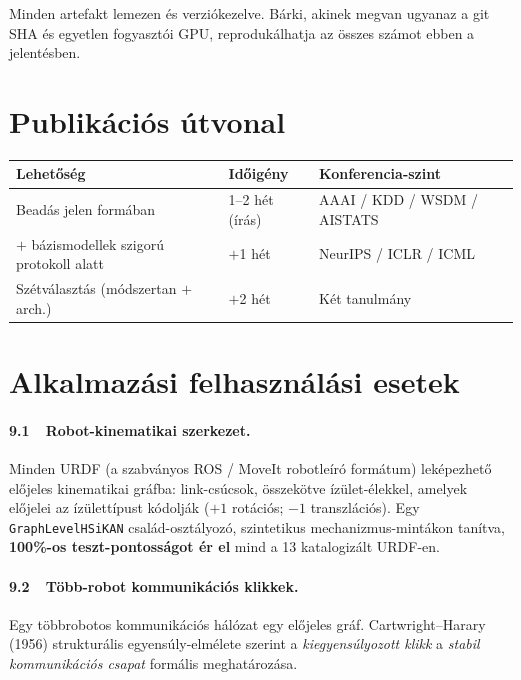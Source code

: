 \documentclass[11pt,a4paper]{article}
\begin{document}
Minden artefakt lemezen \'es verzi\'okezelve. B\'arki, akinek megvan
ugyanaz a git SHA \'es egyetlen fogyaszt\'oi GPU, reproduk\'alhatja az
\"osszes sz\'amot ebben a jelent\'esben.

\section{Publik\'aci\'os \'utvonal}

\begin{center}
\begin{tabular}{lll}
\toprule
\textbf{Lehet\H{o}s\'eg} & \textbf{Id\H{o}ig\'eny} & \textbf{Konferencia-szint} \\
\midrule
Bead\'as jelen form\'aban                  & 1--2 h\'et (\'ir\'as) & AAAI / KDD / WSDM / AISTATS \\
$+$ b\'azismodellek szigor\'u protokoll alatt & $+$1 h\'et           & NeurIPS / ICLR / ICML \\
Sz\'etv\'alaszt\'as (m\'odszertan $+$ arch.) & $+$2 h\'et           & K\'et tanulm\'any \\
\bottomrule
\end{tabular}
\end{center}

\section{Alkalmaz\'asi felhaszn\'al\'asi esetek}

\paragraph{9.1\ \ Robot-kinematikai szerkezet.} Minden URDF (a
szabv\'anyos ROS / MoveIt robotle\'ir\'o form\'atum) lek\'epezhet\H{o}
el\H{o}jeles kinematikai gr\'afba: link-cs\'ucsok, \"osszek\"otve
\'iz\"ulet-\'elekkel, amelyek el\H{o}jelei az \'iz\"ulett\'ipust
k\'odolj\'ak ($+1$ rot\'aci\'os; $-1$ transzl\'aci\'os). Egy
\verb|GraphLevelHSiKAN| csal\'ad-oszt\'alyoz\'o, szintetikus
mechanizmus-mint\'akon tan\'itva, \textbf{100\%-os teszt-pontoss\'agot
\'er el} mind a 13 katalogiz\'alt URDF-en.

\paragraph{9.2\ \ T\"obb-robot kommunik\'aci\'os klikkek.} Egy
t\"obbrobotos kommunik\'aci\'os h\'al\'ozat egy el\H{o}jeles gr\'af.
Cartwright--Harary (1956) struktur\'alis egyens\'uly-elm\'elete
szerint a \emph{kiegyens\'ulyozott klikk} a \emph{stabil
kommunik\'aci\'os csapat} form\'alis meghat\'aroz\'asa.
\end{document}
